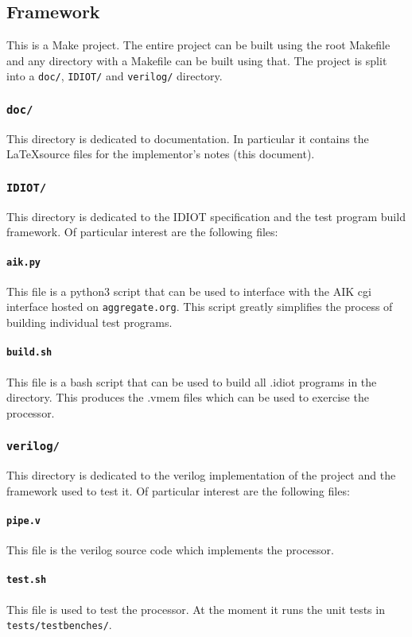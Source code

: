 \documentclass[conference]{IEEEtran}
\begin{document}
\subsection{Framework}
This is a Make project. The entire project can be built using the root Makefile
and any directory with a Makefile can be built using that. The project is split
into a \texttt{doc/}, 
\texttt{IDIOT/} and \texttt{verilog/} directory.
\subsubsection{\texttt{doc/}}
This directory is dedicated to documentation. In particular it contains the
\LaTeX source files for the implementor's notes (this document).
\subsubsection{\texttt{IDIOT/}}
This directory is dedicated to the IDIOT specification and the test program
build framework. Of particular interest are the following files:
\paragraph{\texttt{aik.py}} This file is a python3 script that can be used
to interface with the AIK cgi interface hosted on \texttt{aggregate.org}.
This script greatly simplifies the process of building individual test 
programs.
\paragraph{\texttt{build.sh}} This file is a bash script that can be used
to build all .idiot programs in the directory. This produces the .vmem files
which can be used to exercise the processor.
\subsubsection{\texttt{verilog/}}
This directory is dedicated to the verilog implementation of the project and
the framework used to test it. Of particular interest are the following files:
\paragraph{\texttt{pipe.v}} This file is the verilog source code which 
implements the processor. 
\paragraph{\texttt{test.sh}} This file is used to test the processor. At
the moment it runs the unit tests in \texttt{tests/testbenches/}.
\end{document}
